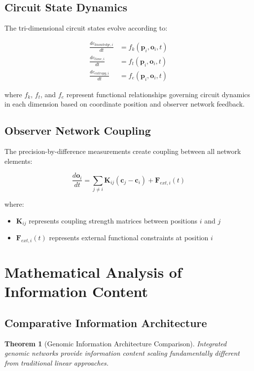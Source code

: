 \documentclass[12pt,a4paper]{article}
\newtheorem{theorem}{Theorem}
\begin{document}
\subsection{Circuit State Dynamics}

The tri-dimensional circuit states evolve according to:

\begin{align}
\frac{dc_{knowledge,i}}{dt} &= f_{k}(\mathbf{p}_i, \mathbf{o}_i, t) \\
\frac{dc_{time,i}}{dt} &= f_{t}(\mathbf{p}_i, \mathbf{o}_i, t) \\
\frac{dc_{entropy,i}}{dt} &= f_{e}(\mathbf{p}_i, \mathbf{o}_i, t)
\end{align}

where $f_k$, $f_t$, and $f_e$ represent functional relationships governing circuit dynamics in each dimension based on coordinate position and observer network feedback.

\subsection{Observer Network Coupling}

The precision-by-difference measurements create coupling between all network elements:

\begin{equation}
\frac{d\mathbf{o}_i}{dt} = \sum_{j \neq i} \mathbf{K}_{ij} (\mathbf{c}_j - \mathbf{c}_i) + \mathbf{F}_{ext,i}(t)
\end{equation}

where:
\begin{itemize}
\item $\mathbf{K}_{ij}$ represents coupling strength matrices between positions $i$ and $j$
\item $\mathbf{F}_{ext,i}(t)$ represents external functional constraints at position $i$
\end{itemize}

\section{Mathematical Analysis of Information Content}

\subsection{Comparative Information Architecture}

\begin{theorem}[Genomic Information Architecture Comparison]
Integrated genomic networks provide information content scaling fundamentally different from traditional linear approaches.
\end{theorem}
\end{document}
